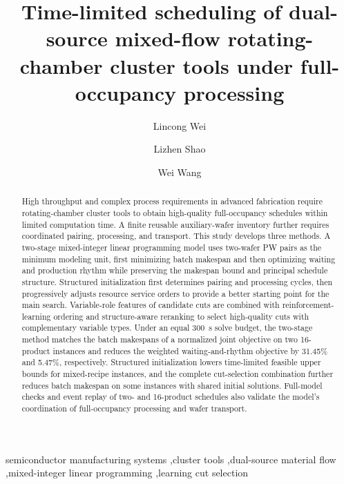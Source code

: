 \documentclass[final,5p,times,twocolumn]{elsarticle}
\begin{document}
\raggedbottom
\begin{frontmatter}

\title{Time-limited scheduling of dual-source mixed-flow rotating-chamber cluster tools under full-occupancy processing}
\author[ustb]{Lincong Wei}
\author[ustb]{Lizhen Shao}
\author[ustb]{Wei Wang}
\address[ustb]{Department of Control Science and Engineering, University of Science and Technology Beijing, No. 30 Xueyuan Road, Haidian District, Beijing 100083, China}

\begin{abstract}
High throughput and complex process requirements in advanced fabrication require rotating-chamber cluster tools to obtain high-quality full-occupancy schedules within limited computation time. A finite reusable auxiliary-wafer inventory further requires coordinated pairing, processing, and transport. This study develops three methods. A two-stage mixed-integer linear programming model uses two-wafer PW pairs as the minimum modeling unit, first minimizing batch makespan and then optimizing waiting and production rhythm while preserving the makespan bound and principal schedule structure. Structured initialization first determines pairing and processing cycles, then progressively adjusts resource service orders to provide a better starting point for the main search. Variable-role features of candidate cuts are combined with reinforcement-learning ordering and structure-aware reranking to select high-quality cuts with complementary variable types. Under an equal 300~s solve budget, the two-stage method matches the batch makespans of a normalized joint objective on two 16-product instances and reduces the weighted waiting-and-rhythm objective by 31.45\% and 5.47\%, respectively. Structured initialization lowers time-limited feasible upper bounds for mixed-recipe instances, and the complete cut-selection combination further reduces batch makespan on some instances with shared initial solutions. Full-model checks and event replay of two- and 16-product schedules also validate the model's coordination of full-occupancy processing and wafer transport.

\end{abstract}
\begin{keyword}
semiconductor manufacturing systems \sep cluster tools \sep dual-source material flow \sep mixed-integer linear programming \sep learning cut selection
\end{keyword}
\end{frontmatter}
\end{document}
